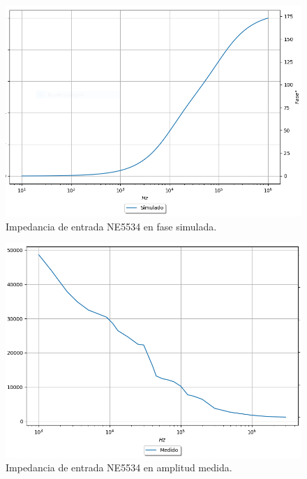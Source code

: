 \begin{figure}[H]	
	\centering
	\includegraphics[width=\textwidth]{Ejercicio2/Imagenes/Zin_F_NE5534_Simulado.png}
	\caption{Impedancia de entrada NE5534 en fase simulada.}
\end{figure}

\begin{figure}[H]	
	\centering
	\includegraphics[width=\textwidth]{Ejercicio2/Imagenes/Zin_A_NE5534_Medido.png}
	\caption{Impedancia de entrada NE5534 en amplitud medida.}
\end{figure}


